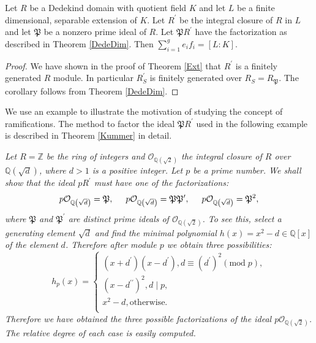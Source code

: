 \begin{corollary}\label{HilbertRami}
Let $R$ be a Dedekind domain with quotient field $K$ and let $L$ be a finite dimensional, separable extension of $K$. Let $R^\prime$ be the integral closure of $R$ in $L$ and let $\mathfrak{P}$ be a nonzero prime ideal of $R$. Let $\mathfrak{P}R^\prime$ have the factorization as described in Theorem \ref{DedeDim}. Then $\sum_{i=1}^ge_if_i=[L:K]$.
\end{corollary}
\begin{proof}
We have shown in the proof of Theorem \ref{Ext} that $R^\prime$ is a finitely generated $R$ module. In particular $R_S^\prime$ is finitely generated over $R_S=R_\mathfrak{P}$. The corollary follows from Theorem \ref{DedeDim}.
\end{proof}
We use an example to illustrate the motivation of studying the concept of ramifications. The method to factor the ideal $\mathfrak{P}R^\prime$ used in the following example is described in Theorem \ref{Kummer} in detail.
\begin{example}\em
Let $R=\mathbb{Z}$ be the ring of integers and $\mathcal{O}_{\mathbb{Q}(\sqrt{2})}$ the integral closure of $R$ over $\mathbb{Q}(\sqrt{d})$, where $d>1$ is a positive integer. Let $p$ be a prime number. We shall show that the ideal $pR^\prime$ must have one of the factorizations:
$$
p\mathcal{O} _{\mathbb{Q} \left( \sqrt{d} \right)}=\mathfrak{P} ,\hspace{0.5cm}p\mathcal{O} _{\mathbb{Q} \left( \sqrt{d} \right)}=\mathfrak{P} \mathfrak{P} ^{\prime},\hspace{0.5cm}p\mathcal{O} _{\mathbb{Q} \left( \sqrt{d} \right)}=\mathfrak{P} ^2,
$$
where $\mathfrak{P}$ and $\mathfrak{P}^\prime$ are distinct prime ideals of $\mathcal{O}_{\mathbb{Q}(\sqrt{2})}$. To see this, select a generating element $\sqrt{d}$ and find the minimal polynomial $h(x)=x^2-d\in\mathbb{Q}[x]$ of the element $d$. Therefore after module $p$ we obtain three possibilities: 
$$
h_p\left( x \right) =\begin{cases}
	\left( x+d^{\prime} \right) \left( x-d^{\prime} \right) ,d\equiv \left( d^{\prime} \right) ^2\left( \mathrm{mod}\;p \right) ,\\
	\left( x-d^{\prime\prime} \right) ^2,d\mid p,\\
	x^2-d,\mathrm{otherwise}.\\
\end{cases}
$$
Therefore we have obtained the three possible factorizations of the ideal $p\mathcal{O}_{\mathbb{Q}(\sqrt{2})}$. The relative degree of each case is easily computed.
\end{example}
